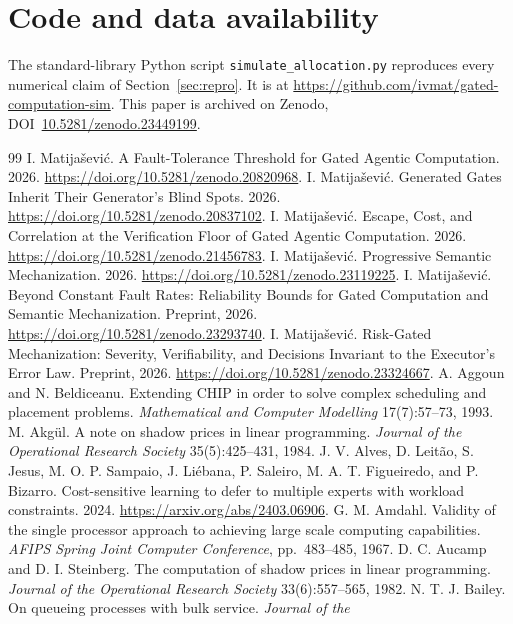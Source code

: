 \documentclass[11pt]{article}
\theoremstyle{definition}
\theoremstyle{remark}
\begin{document}
\section*{Code and data availability}
The standard-library Python script \texttt{simulate\_allocation.py} reproduces every numerical claim of
Section~\ref{sec:repro}. It is at \url{https://github.com/ivmat/gated-computation-sim}.
This paper is archived on Zenodo, DOI~\href{https://doi.org/10.5281/zenodo.23449199}{10.5281/zenodo.23449199}.

\begin{thebibliography}{99}
 I. Matija\v{s}evi\'c. A Fault-Tolerance Threshold for Gated Agentic Computation.
2026. \url{https://doi.org/10.5281/zenodo.20820968}.
 I. Matija\v{s}evi\'c. Generated Gates Inherit Their Generator's Blind Spots.
2026. \url{https://doi.org/10.5281/zenodo.20837102}.
 I. Matija\v{s}evi\'c. Escape, Cost, and Correlation at the Verification Floor of
Gated Agentic Computation. 2026. \url{https://doi.org/10.5281/zenodo.21456783}.
 I. Matija\v{s}evi\'c. Progressive Semantic Mechanization. 2026.
\url{https://doi.org/10.5281/zenodo.23119225}.
 I. Matija\v{s}evi\'c. Beyond Constant Fault Rates: Reliability Bounds for Gated Computation and Semantic Mechanization. 
Preprint, 2026. \url{https://doi.org/10.5281/zenodo.23293740}.
 I. Matija\v{s}evi\'c. Risk-Gated Mechanization: Severity, Verifiability, and Decisions Invariant to the Executor's Error Law. 
Preprint, 2026. \url{https://doi.org/10.5281/zenodo.23324667}.
 A. Aggoun and N. Beldiceanu. Extending CHIP in order to solve complex scheduling
and placement problems. \emph{Mathematical and Computer Modelling} 17(7):57--73, 1993.
 M. Akg\"ul. A note on shadow prices in linear programming. \emph{Journal of the
Operational Research Society} 35(5):425--431, 1984.
 J. V. Alves, D. Leit\~ao, S. Jesus, M. O. P. Sampaio, J. Li\'ebana, P. Saleiro,
M. A. T. Figueiredo, and P. Bizarro. Cost-sensitive learning to defer to multiple experts with workload
constraints. 2024. \url{https://arxiv.org/abs/2403.06906}.
 G. M. Amdahl. Validity of the single processor approach to achieving large scale
computing capabilities. \emph{AFIPS Spring Joint Computer Conference}, pp.~483--485, 1967.
 D. C. Aucamp and D. I. Steinberg. The computation of shadow prices in linear
programming. \emph{Journal of the Operational Research Society} 33(6):557--565, 1982.
 N. T. J. Bailey. On queueing processes with bulk service. \emph{Journal of the
}
\end{thebibliography}
\end{document}
